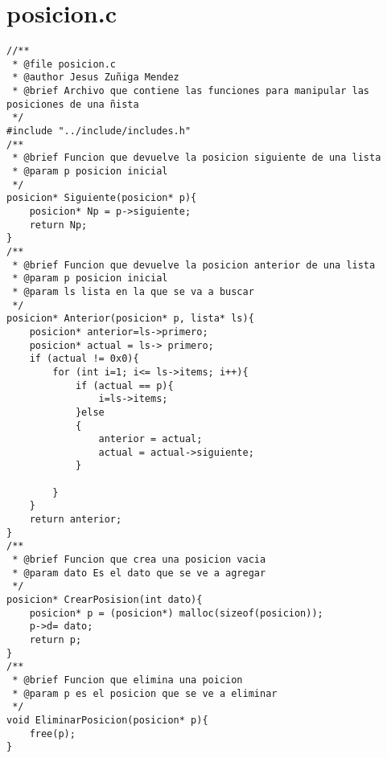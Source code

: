 \section{posicion.c}

\begin{verbatim} 
//**
 * @file posicion.c
 * @author Jesus Zuñiga Mendez
 * @brief Archivo que contiene las funciones para manipular las posiciones de una ñista
 */
#include "../include/includes.h"
/**
 * @brief Funcion que devuelve la posicion siguiente de una lista
 * @param p posicion inicial
 */
posicion* Siguiente(posicion* p){
    posicion* Np = p->siguiente;
    return Np;
}
/**
 * @brief Funcion que devuelve la posicion anterior de una lista
 * @param p posicion inicial
 * @param ls lista en la que se va a buscar
 */
posicion* Anterior(posicion* p, lista* ls){
    posicion* anterior=ls->primero;
    posicion* actual = ls-> primero;
    if (actual != 0x0){
        for (int i=1; i<= ls->items; i++){
            if (actual == p){
                i=ls->items;
            }else
            {
                anterior = actual;
                actual = actual->siguiente;
            }

        }
    }
    return anterior;
}
/**
 * @brief Funcion que crea una posicion vacia
 * @param dato Es el dato que se ve a agregar
 */
posicion* CrearPosision(int dato){
    posicion* p = (posicion*) malloc(sizeof(posicion));
    p->d= dato;
    return p;
}
/**
 * @brief Funcion que elimina una poicion
 * @param p es el posicion que se ve a eliminar
 */
void EliminarPosicion(posicion* p){
    free(p);
}

\end{verbatim}


